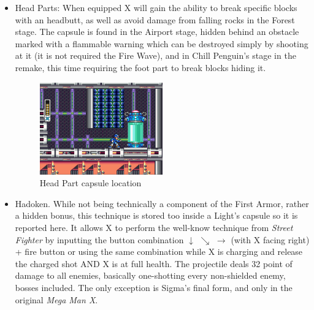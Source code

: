 \begin{itemize}
	
	\item Head Parts: When equipped X will gain the ability to break specific blocks with an headbutt, as well as avoid damage from falling rocks in the Forest stage. The capsule is found in the Airport stage, hidden behind an obstacle marked with a flammable warning which can be destroyed simply by shooting at it (it is not required the Fire Wave), and in Chill Penguin's stage in the remake, this time requiring the foot part to break blocks hiding it.
	\begin{figure}[htp]
		\centering
		\includegraphics[width=0.5\textwidth]{figures/X1/Storm_eagle/Storm_armor_2.jpg}
		\caption{Head Part capsule location}
	\end{figure}
	
	\item Hadoken. While not being technically a component of the First Armor, rather a hidden bonus, this technique is stored too inside a Light's capsule so it is reported here. It allows X to perform the well-know technique from \textit{Street Fighter} by inputting the button combination $\downarrow$ $\searrow$ $\rightarrow$ (with X facing right) + fire button or using the same combination while X is charging and release the charged shot\cite{RTA_wiki:X1}  AND X is at full health. The projectile deals 32 point of damage\cite{wiki:Hadoken} to all enemies, basically one-shotting every non-shielded enemy, bosses included. The only exception is Sigma's final form, and only in the original \textit{Mega Man X}. 
	

\end{itemize}
